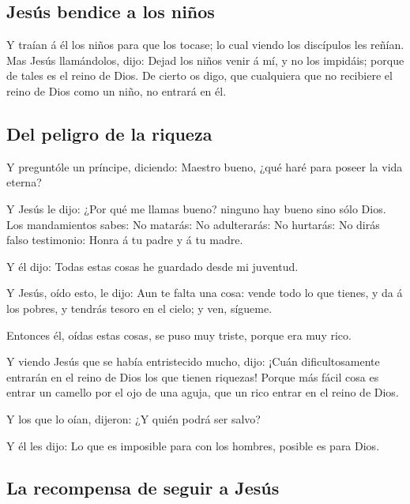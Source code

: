 \hypertarget{jesuxfas-bendice-a-los-niuxf1os}{%
\subsection{Jesús bendice a los
niños}\label{jesuxfas-bendice-a-los-niuxf1os}}

 Y traían á él los niños para que los tocase; lo cual
viendo los discípulos les reñían.  Mas Jesús llamándolos,
dijo: Dejad los niños venir á mí, y no los impidáis; porque de tales es
el reino de Dios.  De cierto os digo, que cualquiera que
no recibiere el reino de Dios como un niño, no entrará en él.

\hypertarget{del-peligro-de-la-riqueza}{%
\subsection{Del peligro de la riqueza}\label{del-peligro-de-la-riqueza}}

 Y preguntóle un príncipe, diciendo: Maestro bueno, ¿qué
haré para poseer la vida eterna?

 Y Jesús le dijo: ¿Por qué me llamas bueno? ninguno hay
bueno sino sólo Dios.  Los mandamientos sabes: No
matarás: No adulterarás: No hurtarás: No dirás falso testimonio: Honra á
tu padre y á tu madre.

 Y él dijo: Todas estas cosas he guardado desde mi
juventud.

 Y Jesús, oído esto, le dijo: Aun te falta una cosa:
vende todo lo que tienes, y da á los pobres, y tendrás tesoro en el
cielo; y ven, sígueme.

 Entonces él, oídas estas cosas, se puso muy triste,
porque era muy rico.

 Y viendo Jesús que se había entristecido mucho, dijo:
¡Cuán dificultosamente entrarán en el reino de Dios los que tienen
riquezas!  Porque más fácil cosa es entrar un camello por
el ojo de una aguja, que un rico entrar en el reino de Dios.

 Y los que lo oían, dijeron: ¿Y quién podrá ser salvo?

 Y él les dijo: Lo que es imposible para con los hombres,
posible es para Dios.

\hypertarget{la-recompensa-de-seguir-a-jesuxfas}{%
\subsection{La recompensa de seguir a
Jesús}\label{la-recompensa-de-seguir-a-jesuxfas}}

